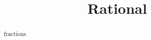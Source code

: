 \documentclass{ximera}
\title{Rational}
\begin{document}
\begin{abstract}
fractions
\end{abstract}
\maketitle
\end{document}
